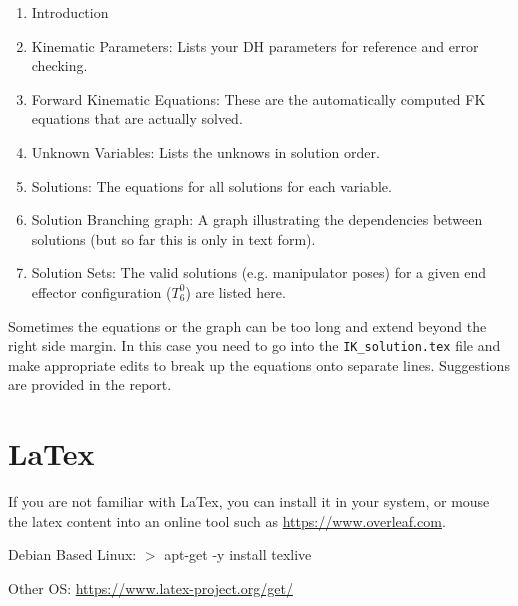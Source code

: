 \documentclass[letterpaper]{article}
\begin{document}
\begin{enumerate}
    \item Introduction
    \item Kinematic Parameters:
    Lists your DH parameters for reference and error checking.
    \item Forward Kinematic Equations:
    These are the automatically computed FK equations that are actually solved. 
    \item Unknown Variables:
    Lists the unknows in solution order. 
    \item Solutions:
    The equations for all solutions for each variable. 
    \item Solution Branching graph:
    A graph illustrating the dependencies between solutions (but so far this is 
    only in text form).
    \item Solution Sets:  The valid solutions (e.g. manipulator poses) for a given end effector configuration (${T_6^0}$)
    are listed here.  
    
\end{enumerate}


Sometimes the equations or the graph can be too long and extend beyond the right side margin.   In this case you need to go into the {\tt IK\_solution.tex} file and make appropriate edits to break up the equations onto separate lines.  Suggestions are provided in the report. 


\section{LaTex}
If you are not familiar with LaTex, you can install it in your system, or mouse the latex content into an online tool such as \url{https://www.overleaf.com}.

Debian Based Linux:   $>$ apt-get -y install texlive
  
Other OS:  \url{https://www.latex-project.org/get/}
\end{document}
